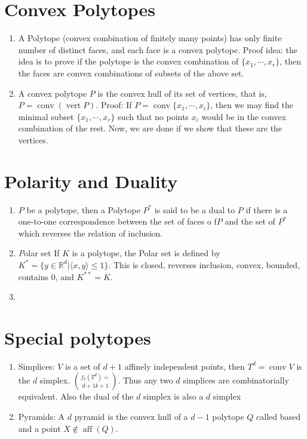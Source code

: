 \documentclass[a4paper,10pt,landscape]{article}
\def\R{\mathbb{R}}
\def\conv{\operatorname{conv}}
\def\aff{\operatorname{aff}}
\def\verti{\operatorname{vert}}
\begin{document}
\begin{multicols}{3}
  \section{Convex Polytopes}
  \begin{enumerate}
  \item A Polytope (convex combination of finitely many points) has only finite
    number of distinct faces, and each face is a convex polytope. Proof idea:
    the idea is to prove if the polytope is the convex combination of $\{x_1,
    \cdots, x_r\}$, then the faces are convex combinations of subsets of the
    above set.
  \item A convex polytope $P$ is the convex hull of its set of vertices, that
    is, $P = \conv(\verti P)$. Proof: If $P = \conv \{x_1, \cdots, x_i\}$, then
    we may find the minimal subset $\{x_1, \cdots, x_r\}$ such that no points
    $x_i$ would be in the convex combination of the rest. Now, we are done if we
    show that these are the vertices.
  \end{enumerate}

  \section{Polarity and Duality}
  \begin{enumerate}
  \item $P$ be a polytope, then a Polytope $P^{*}$ is said to be a dual to $P$
    if there is a one-to-one correspondence between the set of faces o f$P$ and
    the set of $P^{*}$ which reverses the relation of inclusion.
  \item {\emph Polar set} If $K$ is a polytope, the Polar set is defined by
    $K^{*} = \{y \in \R^d \vert \langle x, y \rangle \le 1\}$. This is closed,
    reverses inclusion, convex, bounded, contains 0, and $K^{**} = K$.
  \item 
  \end{enumerate}

  \section{Special polytopes}
  \begin{enumerate}
    \item Simplices: $V$ is a set of $d+1$ affinely independent points, then
      $T^d = \conv V$ is the $d$ simplex. $f_k(T^d) = \choose{d+1}{k+1}$. Thus
      any two $d$ simplices are combinatorially equivalent. Also the dual of the
      $d$ simplex is also a $d$ simplex
    \item Pyramids: A $d$ pyramid is the convex hull of a $d-1$ polytope $Q$ called
      based and a point $X \notin \aff(Q)$.
    \end{enumerate}


\end{multicols}
\end{document}
